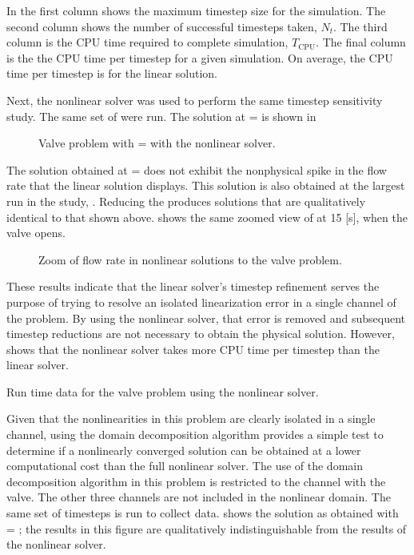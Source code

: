 In  the first column shows the maximum timestep size for the simulation.
The second column shows the number of successful timesteps taken, $N_{t}$.
The third column is the CPU time required to complete simulation, $T_{\text{CPU}}$.
The final column is the the CPU time per timestep for a given simulation.
On average, the CPU time per timestep is  for the linear solution.

Next, the nonlinear solver was used to perform the same timestep sensitivity study.
The same set of \dtmax{} were run.
The solution at \dtmax{} =  is shown in 

\begin{figure}[h!tb]
\centering

\caption{Valve problem with \dtmax{} =  with the nonlinear solver.}
\label{fig:valveNln6pt25em02}
\end{figure}

The solution obtained at \dtmax{} =  does not exhibit the nonphysical spike in the flow rate that the linear solution displays.
This solution is also obtained at the largest \dt{} run in the study, .
Reducing the \dtmax{} produces solutions that are qualitatively identical to that shown above.
 shows the same zoomed view of at 15 [s], when the valve opens.

\begin{figure}[h!tb]
\centering

\caption{Zoom of flow rate in nonlinear solutions to the valve problem.}
\label{fig:valveNlnSols}
\end{figure}

These results indicate that the linear solver's timestep refinement serves the purpose of trying to resolve an isolated linearization error in a single channel of the problem.
By using the nonlinear solver, that error is removed and subsequent timestep reductions are not necessary to obtain the physical solution.
However,  shows that the nonlinear solver takes more CPU time per timestep than the linear solver.

\begin{table}[h!tb]
\centering
\singlespace

\caption{Run time data for the valve problem using the nonlinear solver.}
\label{tab:valveNlnTable}
\end{table}

Given that the nonlinearities in this problem are clearly isolated in a single channel, using the domain decomposition algorithm provides a simple test to determine if a nonlinearly converged solution can be obtained at a lower computational cost than the full nonlinear solver.
The use of the domain decomposition algorithm in this problem is restricted to the channel with the valve.
The other three channels are not included in the nonlinear domain.
The same set of timesteps is run to collect data.
 shows the solution as obtained with \dtmax{} = ; the results in this figure are qualitatively indistinguishable from the results of the nonlinear solver.


